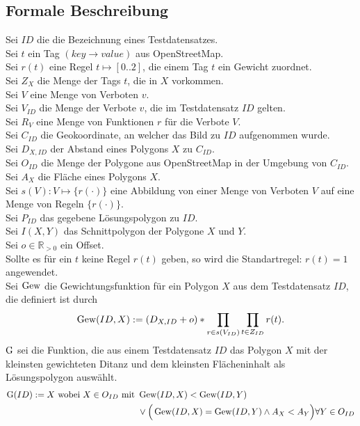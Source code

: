 \subsection{Formale Beschreibung}
Sei $ID$ die die Bezeichnung eines Testdatensatzes.\\
Sei $t$ ein Tag $(key \to value)$ aus OpenStreetMap.\\
Sei $r(t)$ eine Regel $t \mapsto [0..2]$, die einem Tag $t$ ein Gewicht zuordnet. \\
Sei $Z_{X}$ die Menge der Tags $t$, die in $X$ vorkommen.\\
Sei $V$ eine Menge von Verboten $v$.\\
Sei $V_{ID}$ die Menge der Verbote $v$, die im Testdatensatz $ID$ gelten.\\
Sei $R_V$ eine Menge von Funktionen $r$ für die Verbote $V$.\\
Sei $C_{ID}$ die Geokoordinate, an welcher das Bild zu $ID$ aufgenommen wurde. \\
Sei $D_{X,ID}$ der Abstand eines Polygons $X$ zu $C_{ID}$. \\
Sei $O_{ID}$ die Menge der Polygone aus OpenStreetMap in der Umgebung von $C_{ID}$.\\
Sei $A_{X}$ die Fläche eines Polygons $X$.\\
Sei $s(V) : V \mapsto \{r(\cdot)\}$  eine Abbildung von einer Menge von Verboten $V$ auf eine Menge von Regeln $\{r(\cdot)\}$.\\
Sei $P_{ID}$ das gegebene Lösungspolygon zu $ID$.\\
Sei $I(X,Y)$ das Schnittpolygon der Polygone $X$ und $Y$.\\
Sei $o \in \mathbb R _{>0}$ ein Offset.\\
Sollte es für ein $t$ keine Regel $r(t)$ geben, so wird die Standartregel:
$r(t) = 1$ angewendet.\\
Sei $\operatorname{Gew}$ die Gewichtungsfunktion für ein Polygon $X$ aus dem Testdatensatz $ID$, die definiert ist durch
\begin{equation}
\operatorname{Gew}(ID,X) := (D_{X,ID} + o) * \prod_{r \in s(V_{ID})} \prod_{t \in Z_{ID}} r(t).
\end{equation}
$\operatorname{G}$ sei die Funktion, die aus einem Testdatensatz $ID$ das Polygon $X$ mit der kleinsten gewichteten Ditanz und dem
kleinsten Flächeninhalt als Lösungspolygon auswählt.
\begin{align}
\operatorname{G}(ID) := X \text{ wobei } X \in O_{ID} \text{ mit } & \operatorname{Gew}(ID,X) < \operatorname{Gew}(ID,Y)\\
& \lor \Big(\operatorname{Gew}(ID,X)=\operatorname{Gew}(ID,Y) \land A_X < A_Y\Big) \forall Y \in O_{ID} \notag
\end{align}

